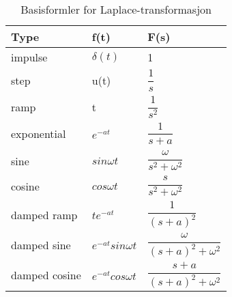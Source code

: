 \documentclass[11pt]{article}
\theoremstyle{definition}
\theoremstyle{definition}
\theoremstyle{definition}
\theoremstyle{definition}
\theoremstyle{definition}
\theoremstyle{definition}
\begin{document}
		\def\arraystretch{2.5}%
		\begin{table}[!ht]
			\centering
			\caption{Basisformler for Laplace-transformasjon}
			\label{my-label}
			\begin{tabular}{p{4cm} p{4cm} l}
				\hline
 				\textbf{Type} & \textbf{f(t)}          & \textbf{F(s)}                        \\ \hline
				impulse       & \(\delta(t)\)          & 1                                    \\ \hline
				step          & u(t)                   & \(\dfrac{1}{s}\)                     \\ \hline
				ramp          & t                      & \(\dfrac{1}{s^2}\)                   \\ \hline
				exponential   & \(e^{-at}\)                 & \(\dfrac{1}{s+a}\)                   \\ \hline
				sine          & \(sin \omega t\)       & \(\dfrac{\omega }{s^2+\omega^2}\)    \\ \hline
				cosine        & \(cos\omega t\)        & \(\dfrac{s}{s^2+\omega^2}\)          \\ \hline
				damped ramp   & \(te^{-at} \)          & \(\dfrac{1}{(s+a)^2}\)               \\ \hline
				damped sine   & \(e^{-at}sin\omega t\) & \(\dfrac{\omega}{(s+a)^2+\omega^2}\) \\ \hline
				damped cosine & \(e^{-at}cos\omega t\) & \(\dfrac{s+a}{(s+a)^2+\omega^2}\)      \\ \hline
			\end{tabular}
		\end{table}
	
	\def\arraystretch{1}%
	\newpage 
\end{document}
